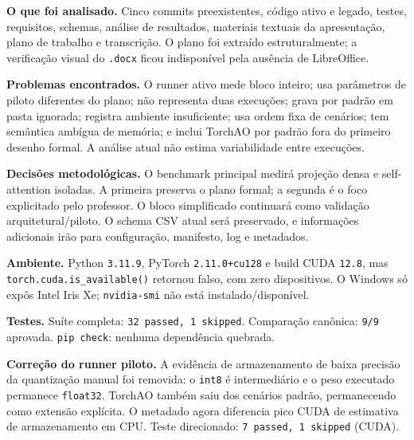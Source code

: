 \textbf{O que foi analisado.} Cinco commits preexistentes, código ativo e legado, testes, requisitos, schemas, análise de resultados, materiais textuais da apresentação, plano de trabalho e transcrição. O plano foi extraído estruturalmente; a verificação visual do \texttt{.\allowbreak{}docx} ficou indisponível pela ausência de LibreOffice.







\textbf{Problemas encontrados.} O runner ativo mede bloco inteiro; usa parâmetros de piloto diferentes do plano; não representa duas execuções; grava por padrão em pasta ignorada; registra ambiente insuficiente; usa ordem fixa de cenários; tem semântica ambígua de memória; e inclui TorchAO por padrão fora do primeiro desenho formal. A análise atual não estima variabilidade entre execuções.







\textbf{Decisões metodológicas.} O benchmark principal medirá projeção densa e self-attention isoladas. A primeira preserva o plano formal; a segunda é o foco explicitado pelo professor. O bloco simplificado continuará como validação arquitetural/piloto. O schema CSV atual será preservado, e informações adicionais irão para configuração, manifesto, log e metadados.





\textbf{Ambiente.} Python \texttt{3.\allowbreak{}11.\allowbreak{}9}, PyTorch \texttt{2.\allowbreak{}11.\allowbreak{}0+cu128} e build CUDA \texttt{12.\allowbreak{}8}, mas \texttt{torch.\allowbreak{}cuda.\allowbreak{}is\_\allowbreak{}available()} retornou falso, com zero dispositivos. O Windows só expôs Intel Iris Xe; \texttt{nvidia-smi} não está instalado/disponível.




\textbf{Testes.} Suíte completa: \texttt{32 passed, 1 skipped}. Comparação canônica: \texttt{9/\allowbreak{}9} aprovada. \texttt{pip check}: nenhuma dependência quebrada.







\textbf{Correção do runner piloto.} A evidência de armazenamento de baixa precisão da quantização manual foi removida: o \texttt{int8} é intermediário e o peso executado permanece \texttt{float32}. TorchAO também saiu dos cenários padrão, permanecendo como extensão explícita. O metadado agora diferencia pico CUDA de estimativa de armazenamento em CPU. Teste direcionado: \texttt{7 passed, 1 skipped} (CUDA).





